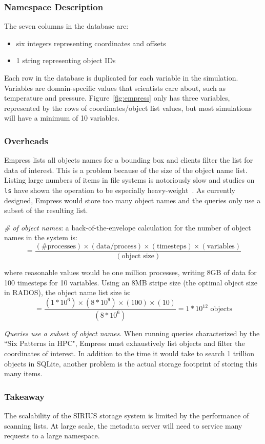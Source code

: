 \subsubsection{Namespace Description}

The seven columns in the database are:

\begin{itemize}
  \item six integers representing coordinates and offsets
  \item 1 string representing object IDs
\end{itemize}

Each row in the database is duplicated for each variable in the simulation.
Variables are domain-specific values that scientists care about, such as
temperature and pressure. Figure~\ref{fig:empress} only has three variables,
represented by the rows of coordinates/object list values, but most simulations
will have a minimum of 10 variables.

\subsubsection{Overheads}

Empress lists all objects names for a bounding box and clients filter the list
for data of interest. This is a problem because of the size of the object name
list.  Listing large numbers of items in file systems is notoriously slow and
studies on \texttt{ls} have shown the operation to be especially
heavy-weight~\cite{carns:ipdps09-pvfs, eshel:fast10-panache}.  As currently
designed, Empress would store too many object names and the queries only use a
subset of the resulting list.

\emph{\# of object names}: a back-of-the-envelope calculation for the number of
object names in the system is:
\[=\frac
  {(\text{\# processes})\times
   (\text{data/process})\times
   (\text{timesteps})\times
   (\text{variables})}
  {(\text{object size})}
\]

where reasonable values would be one million processes, writing 8GB of data
for 100 timesteps for 10 variables. Using an 8MB stripe size (the optimal object size in RADOS), 
the object name list size is:
\[=\frac{(1*10^6)\times(8*10^{9})\times(100)\times(10)}{(8*10^6)}
  = 1*10^{12} \text{ objects}
\]

\emph{Queries use a subset of object names}. When running queries characterized
by the ``Six Patterns in HPC", Empress must exhaustively list objects and
filter the coordinates of interest.  In addition to the time it would take to
search 1 trillion objects in SQLite, another problem is the actual storage
footprint of storing this many items. 

\subsubsection*{Takeaway} The scalability of the SIRIUS storage system is
limited by the performance of scanning lists. At large scale, the metadata
server will need to service many requests to a large namespace.
